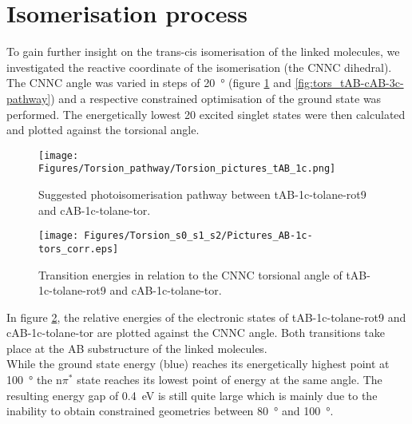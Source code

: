 \section{Isomerisation process}
To gain further insight on the trans-cis isomerisation of the linked molecules, we investigated the reactive coordinate of the isomerisation (the CNNC dihedral).
The CNNC angle was varied in steps of \SI{20}{\degree} (figure \ref{fig:tors_tAB-cAB-1c-pathway} and \ref{fig:tors_tAB-cAB-3c-pathway}) and a respective constrained optimisation of the ground state was performed. 
The energetically lowest 20 excited singlet states were then calculated and plotted against the torsional angle. 
%
%
%
%
%
\begin{figure}[H]
    \centering
    \texttt{[image: Figures/Torsion\_pathway/Torsion\_pictures\_tAB\_1c.png]}
    \caption{Suggested photoisomerisation pathway between tAB-1c-tolane-rot9 and cAB-1c-tolane-tor.}
    \label{fig:tors_tAB-cAB-1c-pathway}
\end{figure}
%
%
\begin{figure}[H]
    \centering
    \texttt{[image: Figures/Torsion\_s0\_s1\_s2/Pictures\_AB-1c-tors\_corr.eps]}
    \caption{Transition energies in relation to the CNNC torsional angle of tAB-1c-tolane-rot9 and cAB-1c-tolane-tor.}
    \label{fig:tors_tAB-cAB-1c}
\end{figure}
%
In figure \ref{fig:tors_tAB-cAB-1c}, the relative energies of the electronic states of tAB-1c-tolane-rot9 and cAB-1c-tolane-tor are plotted against the CNNC angle. 
Both transitions take place at the AB substructure of the linked molecules. \\
While the ground state energy (blue) reaches its energetically highest point at \SI{100}{\degree} the n$\pi^{*}$ state reaches its lowest point of energy at the same angle. 
The resulting energy gap of \SI{0.4}{\eV} is still quite large which is mainly due to the inability to obtain constrained geometries between \SI{80}{\degree} and \SI{100}{\degree}. 
